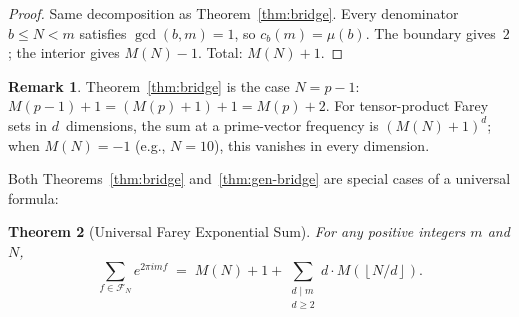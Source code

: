 \documentclass[11pt]{article}
\newtheorem{theorem}{Theorem}[section]
\theoremstyle{definition}
\newtheorem{remark}[theorem]{Remark}
\newcommand{\F}{\mathcal{F}}
\begin{document}
\begin{proof}
Same decomposition as Theorem~\ref{thm:bridge}.  Every
denominator $b \le N < m$ satisfies $\gcd(b, m) = 1$,
so $c_b(m) = \mu(b)$.  The boundary gives~$2$; the
interior gives $M(N) - 1$.  Total: $M(N) + 1$.
\end{proof}

\begin{remark}
Theorem~\ref{thm:bridge} is the case $N = p - 1$:
$M(p-1) + 1 = (M(p) + 1) + 1 = M(p) + 2$.
For tensor-product Farey sets in $d$~dimensions, the sum
at a prime-vector frequency is $(M(N)+1)^d$; when $M(N) = -1$
(e.g., $N = 10$), this vanishes in every dimension.
\end{remark}

Both Theorems~\ref{thm:bridge} and~\ref{thm:gen-bridge} are
special cases of a universal formula:

\begin{theorem}[Universal Farey Exponential Sum]\label{thm:universal}
For any positive integers $m$ and $N$,
\begin{equation}
  \sum_{f \in \F_N} e^{2\pi i m f}
  \;=\; M(N) + 1
  + \sum_{\substack{d \mid m \\ d \ge 2}} d \cdot M\!\left(\left\lfloor N/d \right\rfloor\right).
\end{equation}
\end{theorem}
\end{document}
